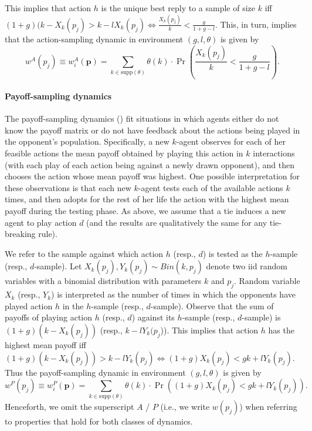 \documentclass[12pt]{article}
\numberwithin{equation}{section}
\numberwithin{figure}{section}
\theoremstyle{definition}
\theoremstyle{plain}
\theoremstyle{plain}
\theoremstyle{plain}
\theoremstyle{remark}
\theoremstyle{plain}
\theoremstyle{plain}
\def\t{\theta}
\begin{document}
This implies that action $h$ is the unique best reply to a sample of size $k$ iff $(1+g)(k-X_k(p_j)>k-lX_k(p_j)\Leftrightarrow \frac{X_k(p_j)}{k}<\frac{g}{1+g-l}$. This, in turn, implies that the action-sampling dynamic in environment $(g,l,\t)$ is given by
\begin{equation}
w^{A}\left(p_{j}\right)\equiv w_{i}^{A}\left(\textbf{p}\right) = \sum_{k\in \text{supp}\left(\theta\right)}\theta(k)\cdot\Pr\left(\frac{X_{k}\left(p_{j}\right)}{k}<\frac{g}{1+g-l}\right).\label{eq:action-sampling0dyanmics}
\end{equation}

\paragraph{Payoff-sampling dynamics}
The payoff-sampling dynamics (\citealp{osborne1998games}) fit situations in which agents either do not know the payoff matrix or do not have feedback about the actions being played in the opponent's population. Specifically, a new $k$-agent observes for each of her feasible actions the mean payoff obtained by playing this action in $k$ interactions (with each play of each action being against a newly drawn opponent), and then chooses the action whose mean payoff was highest. One possible interpretation for these observations is that each new $k$-agent tests each of the available actions $k$ times, and then adopts for the rest of her life the action with the highest mean payoff during the testing phase. As above, we assume that a tie induces a new agent to play  action $d$ (and the results are qualitatively the same for any tie-breaking rule). 

We refer to the sample against which action $h$ (resp.,
$d$) is tested as the $h$-sample (resp., $d$-sample). Let $X_{k}\left(p_{j}\right),Y_{k}\left(p_{j}\right)\sim Bin\left(k,p_{j}\right)$
denote two iid random variables with a binomial distribution with parameters $k$ and $p_{j}$. Random variable $X_{k}$ (resp., $Y_{k}$) is interpreted as the number of times in which the opponents have played action $h$ in the $h$-sample (resp., $d$-sample). 
Observe that the sum of payoffs of playing action $h$ (resp., $d$) against its $h$-sample (resp., $d$-sample) is $(1+g)(k-X_k(p_j))$ 
(resp., $k-l Y_k(p_j$)).
This implies that action $h$ has the highest mean payoff  iff
$(1+g)(k-X_k(p_j))>k-lY_k(p_j)\Leftrightarrow (1+g)X_k(p_j)<gk+lY_k(p_j)$. Thus the payoff-sampling dynamic in environment $(g,l,\t)$ is given by
\begin{equation}
w^{P}\left(p_{j}\right)\equiv w_i^{P}\left(\textbf{p}\right) =\sum_{k\in \text{supp}\left(\theta\right)}\theta(k)\cdot\Pr((1+g)X_k(p_j)<gk+lY_k(p_j)).\label{eq:payoff-smapling-dynamics}    
\end{equation}
Henceforth, we omit the superscript $A$ / $P$ (i.e., we write $w(p_j)$) when referring to properties that hold for both classes of dynamics.
\end{document}
